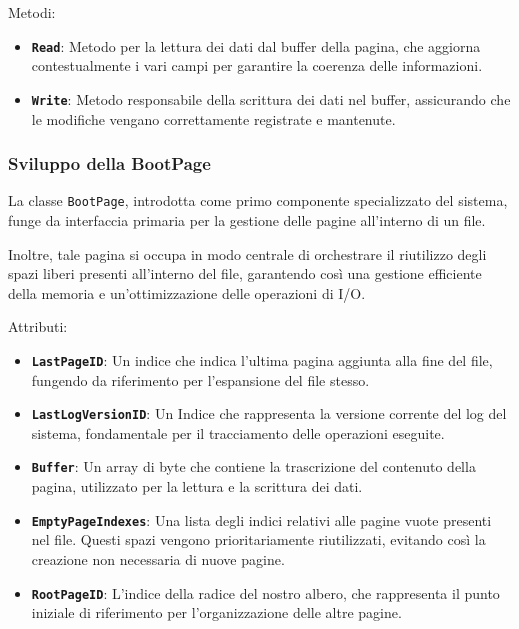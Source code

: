 \documentclass[12pt,a4paper,openright,twoside]{book}
\begin{document}
                Metodi:
                \begin{itemize}
                    \item \textbf{\texttt{Read}}: Metodo per la lettura dei dati dal buffer della pagina, che aggiorna contestualmente i vari campi per garantire la coerenza delle informazioni.
                    \item \textbf{\texttt{Write}}: Metodo responsabile della scrittura dei dati nel buffer, assicurando che le modifiche vengano correttamente registrate e mantenute.
                \end{itemize}

            \subsubsection{Sviluppo della BootPage}

                La classe \texttt{BootPage}, introdotta come primo componente specializzato del sistema, funge da interfaccia primaria per la gestione delle pagine all’interno di un file.

                Inoltre, tale pagina si occupa in modo centrale di orchestrare il riutilizzo degli spazi liberi presenti all’interno del file, garantendo così una gestione efficiente della memoria e un’ottimizzazione delle operazioni di I/O.

                

                Attributi:
                \begin{itemize}
                    \item \textbf{\texttt{LastPageID}}: Un indice che indica l’ultima pagina aggiunta alla fine del file, fungendo da riferimento per l’espansione del file stesso.
                    \item \textbf{\texttt{LastLogVersionID}}: Un Indice che rappresenta la versione corrente del log del sistema, fondamentale per il tracciamento delle operazioni eseguite.
                    \item \textbf{\texttt{Buffer}}: Un array di byte che contiene la trascrizione del contenuto della pagina, utilizzato per la lettura e la scrittura dei dati.
                    \item \textbf{\texttt{EmptyPageIndexes}}: Una lista degli indici relativi alle pagine vuote presenti nel file.
                    Questi spazi vengono prioritariamente riutilizzati, evitando così la creazione non necessaria di nuove pagine.
                    \item \textbf{\texttt{RootPageID}}: L'indice della radice del nostro albero, che rappresenta il punto iniziale di riferimento per l’organizzazione delle altre pagine.
                \end{itemize}
\end{document}
